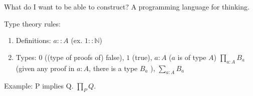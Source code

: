 \documentclass{article}
\begin{document}
What do I want to be able to construct? A programming language for thinking.

Type theory rules:
\begin{enumerate}
\item Definitions: $a :: A$ (ex. $1 :: \mathbb{N}$)
\item Types: 
      $0$ ((type of proofs of) false),
      $1$ (true), 
      $a : A$ ($a$ is of type $A$)
      $\prod_{a:A} B_a$ (given any proof in $a : A$, there is a type $B_a$  ),
      $\sum_{a:A} B_a$

\end{enumerate}

Example: P implies Q.  $\prod_{P} Q$.
\end{document}
